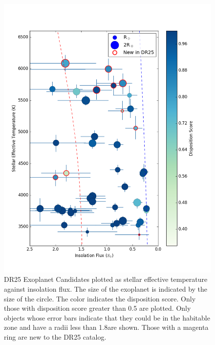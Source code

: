 \begin{figure}
    \centering
    \includegraphics[width=1.1\linewidth]{fig-hzTstarInsol.png}
    \caption{DR25 Exoplanet Candidates plotted as stellar effective temperature against insolation flux. The size of the exoplanet is indicated by the size of the circle.  The color indicates the disposition score. Only those with disposition score greater than 0.5 are plotted.  Only objects whose error bars indicate that they could be in the habitable zone and have a radii less than 1.8\re are shown. Those with a magenta ring are new to the DR25 catalog. }
    \label{f:hzNarrow}
\end{figure}


